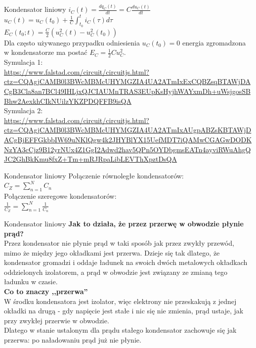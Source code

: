 \begin{frame}{Kondensator liniowy}
	$i_C(t) = \frac{d q_C (t)}{dt} = C \frac{d u_C(t)}{dt}$\\
	$u_C(t) = u_C(t_0) + \frac{1}{C} \int_{t_0}^t i_C(\tau) d \tau$\\
	$E_C(t_0; t) = \frac{C}{2} \left( u^2_C(t) - u^2_C(t_0) \right)$\\
	Dla często używanego przypadku odniesienia $u_C(t_0) = 0$ energia zgromadzona w kondensatorze ma postać $E_C = \frac{1}{2} C u_C^2$.\\
	Symulacja 1:\\
	\url{https://www.falstad.com/circuit/circuitjs.html?ctz=CQAgjCAMB0l3BWcMBMcUHYMGZIA4UA2ATmIxExCQBZsqBTAWjDACgB3Cla8an7BCl49IHLjxQJCIAUMnTRAS3EUpKsHyjhWAYxmDh+uWsjgosSBBhw2AexkhCIkNUilzYKZPDQFFB9isQA} \\
	Symulacja 2:\\
	\url{https://www.falstad.com/circuit/circuitjs.html?ctz=CQAgjCAMB0l3BWcMBMcUHYMGZIA4UA2ATmIxAUgpABZsKBTAWjDACgBjEFFGkbbIW69uNKlQgw4k2JHYBlYX15UefMDT7iQAMwCGAGwDODKNzYA3cCjz9B12yrNUx4Z1GgI2Adwd2hav5QPn5OYDbgmsEATn4ayviRWuAhgQJC2GhBkKmu8fxZ+Tm+mRJRpaLibLEVThXpztDsQA} \\
\end{frame}

\begin{frame}{Kondensator liniowy}
	Połączenie równoległe kondensatorów:\\
	$C_Z = \sum_{n=1}^N C_n$\\
	Połączenie szeregowe kondensatorów:\\
	$\frac{1}{C_Z} = \sum_{n=1}^N \frac{1}{C_n}$\\
\end{frame}

\begin{frame}{Kondensator liniowy}
	\textbf{Jak to działa, że przez przerwę w obwodzie płynie prąd?}\\
	Przez kondensator nie płynie prąd w taki sposób jak przez zwykły przewód, mimo że między jego okładkami jest przerwa.
	Dzieje się tak dlatego, że kondensator gromadzi i oddaje ładunek na swoich dwóch metalowych okładkach oddzielonych izolatorem, a prąd w obwodzie jest związany ze zmianą tego ładunku w czasie.\\
	\textbf{Co to znaczy ,,przerwa''}\\
	W środku kondensatora jest izolator, więc elektrony nie przeskakują z jednej okładki na drugą - gdy napięcie jest stałe i nic się nie zmienia, prąd ustaje, jak przy zwykłej przerwie w obwodzie.
	\\
	Dlatego w stanie ustalonym dla prądu stałego kondensator zachowuje się jak przerwa: po naładowaniu prąd już nie płynie.\\
\end{frame}

